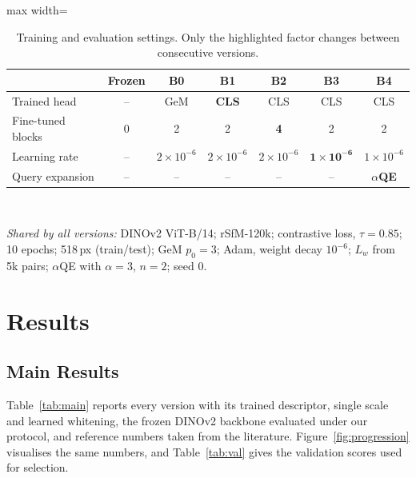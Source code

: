 \documentclass[runningheads]{llncs}
\newcommand{\aqe}{$\alpha$QE}
\begin{document}
\begin{table}[t]
\centering
\caption{Training and evaluation settings. Only the highlighted factor changes
between consecutive versions.}
\label{tab:hparams}
\setlength{\tabcolsep}{4pt}
\begin{adjustbox}{max width=\textwidth}
\begin{tabular}{@{}lcccccc@{}}
\toprule
 & Frozen & B0 & B1 & B2 & B3 & B4 \\
\midrule
Trained head          & -- & GeM & \textbf{CLS} & CLS & CLS & CLS \\
Fine-tuned blocks     & 0 & 2 & 2 & \textbf{4} & 2 & 2 \\
Learning rate         & -- & $2\!\times\!10^{-6}$ & $2\!\times\!10^{-6}$ & $2\!\times\!10^{-6}$ & $\mathbf{1\!\times\!10^{-6}}$ & $1\!\times\!10^{-6}$ \\
Query expansion       & -- & -- & -- & -- & -- & \textbf{\aqe{}} \\
\bottomrule
\end{tabular}
\end{adjustbox}\\[3pt]
\parbox{0.92\linewidth}{\footnotesize\emph{Shared by all versions:} DINOv2
ViT-B/14; rSfM-120k; contrastive loss, $\tau=0.85$; 10 epochs; 518\,px
(train/test); GeM $p_0=3$; Adam, weight decay $10^{-6}$; $L_w$ from 5k pairs;
\aqe{} with $\alpha=3$, $n=2$; seed 0.}
\end{table}

\section{Results}
\label{sec:results}

\subsection{Main Results}

Table~\ref{tab:main} reports every version with its trained descriptor, single
scale and learned whitening, the frozen DINOv2 backbone evaluated under our
protocol, and reference numbers taken from the literature.
Figure~\ref{fig:progression} visualises the same numbers, and
Table~\ref{tab:val} gives the validation scores used for selection.
\end{document}

